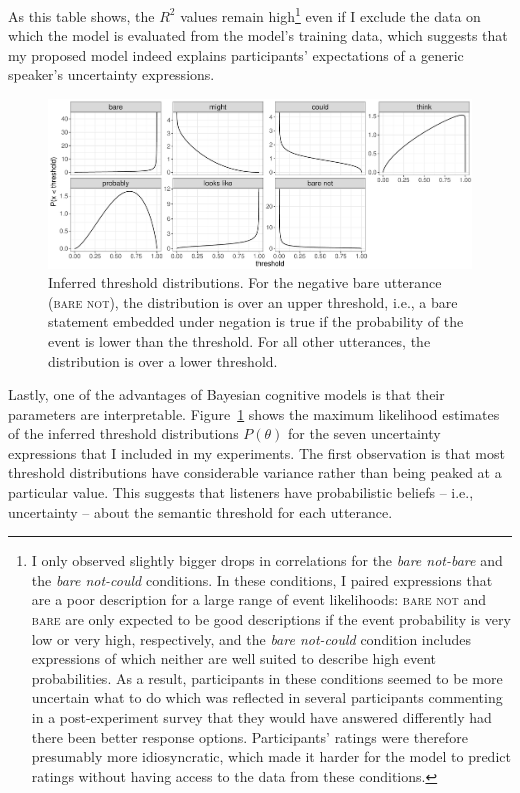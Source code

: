 As this table shows, the $R^2$ values remain high\footnote{I only observed slightly bigger drops in correlations for the \textit{bare not-bare} and the \textit{bare not-could} conditions. In these conditions, I paired expressions that are a poor description for a large range of event likelihoods: \textsc{bare not} and \textsc{bare} are only expected to be good descriptions if the event probability is very low or very high, respectively, and the \textit{bare not-could} condition includes expressions of which neither are well suited to describe high event probabilities. As a result, participants in these conditions seemed to be more uncertain what to do which was reflected in several participants commenting in a post-experiment survey that they would have answered differently had there been better response options. Participants' ratings were therefore presumably more idiosyncratic, which made it harder for the model to predict ratings without having access to the data from these conditions.} even if I exclude the data on which the model is evaluated from the model's training data, 
which suggests that my proposed model indeed explains
participants' expectations of a generic speaker's uncertainty expressions. 

\begin{figure}[th!]
\includegraphics[width=\textwidth]{plots/fig-7-threshold-distributions-prior.pdf}
\caption{Inferred threshold distributions. For the negative bare utterance (\textsc{bare not}), the distribution is over an upper threshold, i.e., a bare statement embedded under negation is true if the probability of the event is lower than the threshold. For all other utterances, the distribution is over a lower threshold.
\label{fig:threshold-distributions}}
\end{figure}

Lastly, one of the advantages of Bayesian cognitive models is that their parameters are interpretable. Figure~\ref{fig:threshold-distributions} shows the 
maximum likelihood estimates of the inferred threshold distributions $P(\theta)$ for the seven uncertainty expressions that I included in my experiments.
The first observation is that most threshold distributions have considerable variance rather than being peaked at a particular value. This suggests that
listeners have probabilistic beliefs -- i.e., uncertainty -- about the semantic threshold for each utterance.

